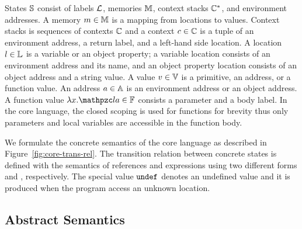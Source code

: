 States $\mathbb{S}$ consist of labels $\mathcal{L}$, memories $\mathbb{M}$, context stacks
$\mathbb{C}^*$, and environment addresses.  A memory $m \in \mathbb{M}$ is a
mapping from locations to values.  Context stacks is sequences of contexts
$\mathbb{C}$ and a context $c \in \mathbb{C}$ is a tuple of an environment
address, a return label, and a left-hand side location.  A location $l \in
\mathbb{L}$ is a variable or an object property; a variable location consists of an
environment address and its name, and an object property location consists of an
object address and a string value.  A value $v \in \mathbb{V}$ is a primitive,
an address, or a function value.  An address $a \in \mathbb{A}$ is an
environment address or an object address.  A function value
$\fval{x}{\lab}{\addr} \in \fvalset$ consists a parameter and a body label.  In
the core language, the closed scoping is used for functions for brevity thus
only parameters and local variables are accessible in the function body.

We formulate the concrete semantics of the core language as described in
Figure~\ref{fig:core-trans-rel}.  The transition relation between concrete
states is defined with the semantics of references and expressions using two
different forms  and
\fbox{$\exprrule{\st}{\expr}{\val}$}, respectively.  The special value
$\texttt{undef}$ denotes an undefined value and it is produced when the program access
an unknown location.


\subsection{Abstract Semantics}

\todo
